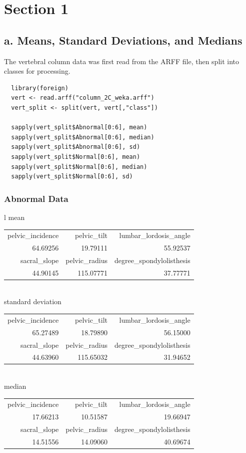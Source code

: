\documentclass{report}
\begin{document}
\chapter{Section 1}
\section{a. Means, Standard Deviations, and Medians}

The vertebral column data was first read from the ARFF file, then split into classes for processing.

\begin{verbatim}
  library(foreign)
  vert <- read.arff("column_2C_weka.arff")
  vert_split <- split(vert, vert[,"class"])

  sapply(vert_split$Abnormal[0:6], mean)
  sapply(vert_split$Abnormal[0:6], median)
  sapply(vert_split$Abnormal[0:6], sd)
  sapply(vert_split$Normal[0:6], mean)
  sapply(vert_split$Normal[0:6], median)
  sapply(vert_split$Normal[0:6], sd)
\end{verbatim}

\subsection{Abnormal Data}

\begin{tabular}{l}
  mean \\
  \hskip 1.0cm\begin{tabular}{rrr}
    pelvic\_incidence & pelvic\_tilt & lumbar\_lordosis\_angle \\
    64.69256 & 19.79111 & 55.92537 \\
    sacral\_slope & pelvic\_radius & degree\_spondylolisthesis \\
    44.90145 & 115.07771 & 37.77771 \\
  \end{tabular} \\
  standard deviation \\
  \hskip 1.0cm\begin{tabular}{rrr}
    pelvic\_incidence & pelvic\_tilt & lumbar\_lordosis\_angle \\
    65.27489 & 18.79890 & 56.15000 \\
    sacral\_slope & pelvic\_radius & degree\_spondylolisthesis \\
    44.63960 & 115.65032 & 31.94652 \\
  \end{tabular} \\
  median \\
  \hskip 1.0cm\begin{tabular}{rrr}
    pelvic\_incidence & pelvic\_tilt & lumbar\_lordosis\_angle \\
    17.66213 & 10.51587 & 19.66947 \\
    sacral\_slope & pelvic\_radius & degree\_spondylolisthesis \\
    14.51556 & 14.09060 & 40.69674 \\
  \end{tabular}
\end{tabular}
\end{document}
